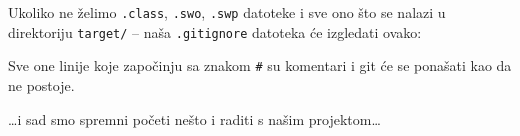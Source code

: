 Ukoliko ne želimo \verb+.class+, \verb+.swo+, \verb+.swp+ datoteke i sve ono što se nalazi u direktoriju \verb+target/+ -- naša \verb+.gitignore+ datoteka će izgledati ovako:

\gitoutputcommand{%
\color{gray}{\# Vim privremene datoteke:}\\
\color{black}{*.swp}\\
\color{black}{*.swo}\\
\color{gray}{\# Java kompajlirane klase:}\\
\color{black}{*.class}\\
\color{gray}{\# Output direktorij s rezultatima kompajliranja i builda:}\\
\color{black}{target/*}%
}

Sve one linije koje započinju sa znakom \verb+#+ su komentari i git će se ponašati kao da ne postoje.

\dots{}i sad smo spremni početi nešto i raditi s našim projektom\dots


